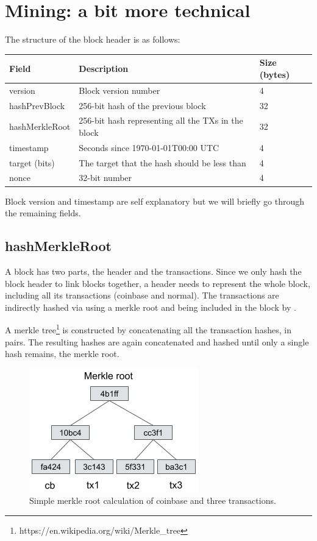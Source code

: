 \section{Mining: a bit more technical}

The structure of the block header is as follows:

\begin{center}
\begin{tabular}{ |l|l|l| }
\hline
	Field & Description & Size (bytes)\\
\hline
	version        & Block version number                               & 4\\
	hashPrevBlock  & 256-bit hash of the previous block                 & 32\\
	hashMerkleRoot & 256-bit hash representing all the TXs in the block & 32\\
	timestamp      & Seconds since 1970-01-01T00:00 UTC                 & 4\\
	target (bits)  & The target that the hash should be less than       & 4\\
	nonce          & 32-bit number                                      & 4\\
\hline
\end{tabular}
\end{center}

Block version and timestamp are self explanatory but we will briefly go through the remaining fields.

\subsection*{hashMerkleRoot}
A block has two parts, the header and the transactions. Since we only hash the block header to link blocks together, a header needs to represent the whole block, including all its transactions (coinbase and normal). The transactions are indirectly hashed via using a merkle root and being included in the block by .

A merkle tree\footnote{https://en.wikipedia.org/wiki/Merkle\_tree} is constructed by concatenating all the transaction hashes, in pairs. The resulting hashes are again concatenated and hashed until only a single hash remains, the merkle root.

\begin{figure}[h]
\begin{center}
\includegraphics[scale=0.5]{images/merkle-tree}
\caption{Simple merkle root calculation of coinbase and three transactions.}
\label{fig:merkle-tree}
\end{center}
\end{figure}


